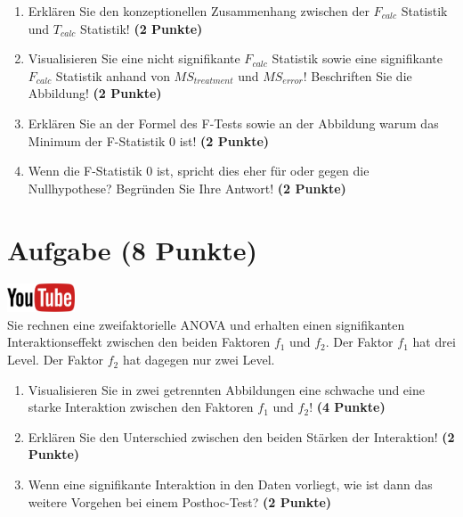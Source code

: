 \documentclass[a4paper, 9pt]{scrartcl}\usepackage[]{graphicx}\usepackage[]{xcolor}
\begin{document}
\begin{enumerate}
\item Erkl{\"a}ren Sie den konzeptionellen Zusammenhang zwischen der $F_{calc}$
  Statistik und $T_{calc}$ Statistik! \textbf{(2 Punkte)}
\item Visualisieren Sie eine nicht signifikante $F_{calc}$ Statistik sowie
  eine signifikante $F_{calc}$ Statistik anhand von $MS_{treatment}$ und
  $MS_{error}$! Beschriften Sie die Abbildung! \textbf{(2 Punkte)}
\item Erkl{\"a}ren Sie an der Formel des F-Tests sowie an der Abbildung warum
  das Minimum der F-Statistik 0 ist! \textbf{(2 Punkte)}
\item Wenn die F-Statistik 0 ist, spricht dies eher f{\"u}r oder gegen die
  Nullhypothese? Begr{\"u}nden Sie Ihre Antwort! \textbf{(2 Punkte)}
\end{enumerate}

 
\clearpage

\section{Aufgabe \hfill (8 Punkte)}

\hfill\href{https://youtu.be/2qG1Dws0MJo}{\includegraphics[width =
  2cm]{img/youtube}}\\[1Ex]


Sie rechnen eine zweifaktorielle ANOVA und erhalten einen signifikanten
Interaktionseffekt zwischen den beiden Faktoren $f_1$ und $f_2$. Der Faktor
$f_1$ hat drei Level. Der Faktor $f_2$ hat dagegen nur zwei Level.




\begin{enumerate}
\item Visualisieren Sie in zwei getrennten Abbildungen 
  eine schwache und eine starke Interaktion zwischen
  den Faktoren $f_1$ und $f_2$! \textbf{(4 Punkte)}
\item Erkl{\"a}ren Sie den Unterschied zwischen den beiden St{\"a}rken der Interaktion!
  \textbf{(2 Punkte)}
\item Wenn eine signifikante Interaktion in den Daten vorliegt, wie ist
  dann das weitere Vorgehen bei einem Posthoc-Test? 
  \textbf{(2 Punkte)}
\end{enumerate}
\end{document}
